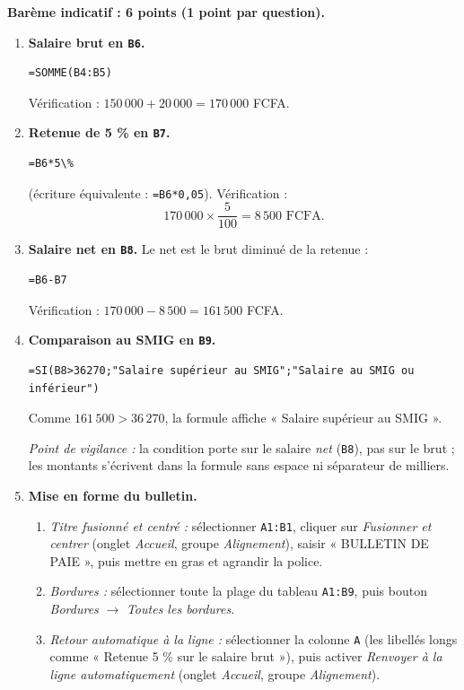 \documentclass[11pt]{article}
\begin{document}
\begin{corrige}\tcblower
\textbf{Barème indicatif : 6 points (1 point par question).}

\begin{enumerate}
\item \textbf{Salaire brut en \texttt{B6}.}
\begin{lstlisting}
=SOMME(B4:B5)
\end{lstlisting}
Vérification : $150\,000 + 20\,000 = 170\,000$ FCFA.

\item \textbf{Retenue de 5 \% en \texttt{B7}.}
\begin{lstlisting}
=B6*5\%
\end{lstlisting}
(écriture équivalente : \texttt{=B6*0,05}). Vérification :
\[ 170\,000 \times \frac{5}{100} = 8\,500 \text{ FCFA}. \]

\item \textbf{Salaire net en \texttt{B8}.} Le net est le brut diminué de la retenue :
\begin{lstlisting}
=B6-B7
\end{lstlisting}
Vérification : $170\,000 - 8\,500 = 161\,500$ FCFA.

\item \textbf{Comparaison au SMIG en \texttt{B9}.}
\begin{lstlisting}
=SI(B8>36270;"Salaire supérieur au SMIG";"Salaire au SMIG ou inférieur")
\end{lstlisting}
Comme $161\,500 > 36\,270$, la formule affiche « Salaire supérieur au SMIG ».

\emph{Point de vigilance :} la condition porte sur le salaire \emph{net} (\texttt{B8}), pas sur le brut ; les montants s'écrivent dans la formule sans espace ni séparateur de milliers.

\item \textbf{Mise en forme du bulletin.}
\begin{enumerate}
\item \emph{Titre fusionné et centré :} sélectionner \texttt{A1:B1}, cliquer sur \emph{Fusionner et centrer} (onglet \emph{Accueil}, groupe \emph{Alignement}), saisir « BULLETIN DE PAIE », puis mettre en gras et agrandir la police.
\item \emph{Bordures :} sélectionner toute la plage du tableau \texttt{A1:B9}, puis bouton \emph{Bordures} $\to$ \emph{Toutes les bordures}.
\item \emph{Retour automatique à la ligne :} sélectionner la colonne \texttt{A} (les libellés longs comme « Retenue 5 \% sur le salaire brut »), puis activer \emph{Renvoyer à la ligne automatiquement} (onglet \emph{Accueil}, groupe \emph{Alignement}).
\end{enumerate}


\end{enumerate}
\end{corrige}
\end{document}
